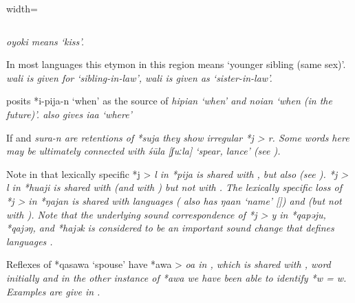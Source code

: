 \begin{table}
\begin{adjustbox}{width=\textwidth}
\begin{threeparttable}
\begin{tabular}{llllllll}
	\end{tabular}
		\begin{tablenotes}\tnsize
			\item[†]	{ \it{oyoki} means ‘kiss’.}
			\item[‡]	{In most languages this etymon in this region means ‘younger sibling (same sex)’.
								 \it{wali} is given for ‘sibling-in-law’,
								 \it{wali} is given as ‘sister-in-law’.}
			\item[Δ]	{\citet[132]{Mead2003a} posits *i-pija-n ‘when’ as the source
								of  \it{hipian} ‘when’
								and  \it{noian} ‘when (in the future)’.
								\citet[151]{Bergh1953} also gives  \it{iaa} ‘where’}
			\item[{ǁ}]	{If 
								and  \it{sura-n} are retentions of *suja they show irregular *j > \it{r}.
								Some words here may be ultimately connected with  \it{śūla}
								[ʃuːla] ‘spear, lance’ (see \citealp[568]{Hoogervorst2016}).}
		\end{tablenotes}
	\end{threeparttable}
\end{adjustbox}
\end{table}

Note in  that lexically specific *j > \it{l} in *pija
is shared with ,
but also  (see ).
*j > \it{l} in *huaji is shared with  (and with )
but not with .
The lexically specific loss of *j > {\0} in *ŋajan is shared
with  languages ( also has \it{ŋaan}
‘name’ [\citealp[76]{Mead2003b}]) and  (but not with ).
Note that the underlying sound correspondence of *j > \it{y}
in *qapəju, *qajəŋ, and *hajək is considered to be an important sound change
that defines  languages \citep{Mead2003a}.

Reflexes of *qasawa ‘spouse’ have *awa > \it{oa} in ,
which is shared with  \citep[72f, 83]{Mead2003b},
word initially and in the other instance of *awa we have
been able to identify *w = \it{w}.
Examples are give in .

